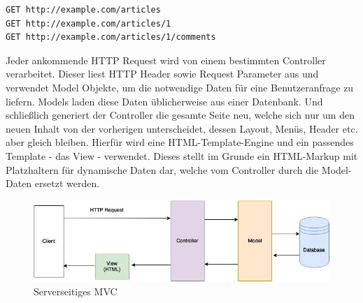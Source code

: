 \begin{verbatim}
GET http://example.com/articles
GET http://example.com/articles/1
GET http://example.com/articles/1/comments
\end{verbatim}

Jeder ankommende HTTP Request wird von einem bestimmten Controller verarbeitet. Dieser liest HTTP Header sowie Request Parameter aus und verwendet Model Objekte, um die notwendige Daten für eine Benutzeranfrage zu liefern. Models laden diese Daten üblicherweise aus einer Datenbank. Und schließlich generiert der Controller die gesamte Seite neu, welche sich nur um den neuen Inhalt von der vorherigen unterscheidet, dessen Layout, Menüs, Header etc. aber gleich bleiben. Hierfür wird eine HTML-Template-Engine und ein passendes Template - das View - verwendet. Dieses stellt im Grunde ein HTML-Markup mit Platzhaltern für dynamische Daten dar, welche vom Controller durch die Model-Daten ersetzt werden.


\begin{figure}[htp]     %
\centering
\includegraphics[width=1.0\textwidth]{images/server_side_mvc}
\caption{Serverseitiges MVC}\label{server_side_mvc}
\end{figure}






